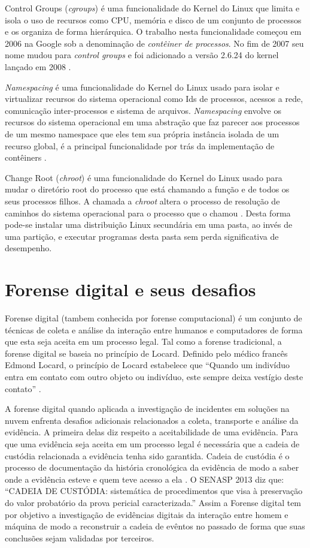 Control Groups (\textit{cgroups}) é uma funcionalidade do Kernel do Linux que limita e isola o uso de recursos como CPU, memória e disco de um conjunto de processos e os organiza de forma hierárquica. 
%
O trabalho nesta funcionalidade começou em 2006 na Google sob a denominação de \textit{contêiner de processos}. No fim de 2007 seu nome mudou para \textit{control groups} e foi adicionado a versão 2.6.24 do kernel lançado em 2008 \cite{UnixManPagesControlGroups}.

\textit{Namespacing} é uma funcionalidade do Kernel do Linux usado para isolar e virtualizar recursos do sistema operacional como Ids de processos, acessos a rede, comunicação inter-processos e sistema de arquivos.
%
\textit{Namespacing} envolve os recursos do sistema operacional em uma abstração que faz parecer aos processos de um mesmo namespace que eles tem sua própria instância isolada de um recurso global, é a principal funcionalidade por trás da implementação de contêiners \cite{UnixManPagesNamespacing}.

Change Root (\textit{chroot}) é uma funcionalidade do Kernel do Linux usado para mudar o diretório root do processo que está chamando a função e de todos os seus processos filhos. 
%
A chamada a \textit{chroot} altera o processo de resolução de caminhos do sistema operacional para o processo que o chamou \cite{UnixManPagesChRoot}.
%
Desta forma pode-se instalar uma distribuição Linux secundária em uma pasta, ao invés de uma partição, e executar programas desta pasta sem perda significativa de desempenho.

\section{Forense digital e seus desafios}
\label{sec:forensedigital}

Forense digital (tambem conhecida por forense computacional) é um conjunto de técnicas de coleta e análise da interação entre humanos e computadores de forma que esta seja aceita em um processo legal.
%
Tal como a forense tradicional, a forense digital se baseia no princípio de Locard. Definido pelo médico francês Edmond Locard, o princípio de Locard estabelece que ``Quando um indivíduo entra em contato com outro objeto ou indivíduo, este sempre deixa vestígio deste contato'' \cite{Ramos:2011}.

A forense digital quando aplicada a investigação de incidentes em soluções na nuvem enfrenta desafios adicionais relacionados a coleta, transporte e análise da evidência.
%
A primeira delas diz respeito a aceitabilidade de uma evidência. Para que uma evidência seja aceita em um processo legal é necessária que a cadeia de custódia relacionada a evidência tenha sido garantida.
%
Cadeia de custódia é o processo de documentação da história cronológica da evidência de modo a saber onde a evidência esteve e quem teve acesso a ela \cite{Ramos:2011}. O SENASP 2013 diz que: ``CADEIA DE CUSTÓDIA: sistemática de procedimentos que visa à preservação do valor probatório da prova pericial caracterizada.''
%
Assim a Forense digital tem por objetivo a investigação de evidências digitais da interação entre homem e máquina de modo a reconstruir a cadeia de evêntos no passado de forma que suas conclusões sejam validadas por terceiros.



